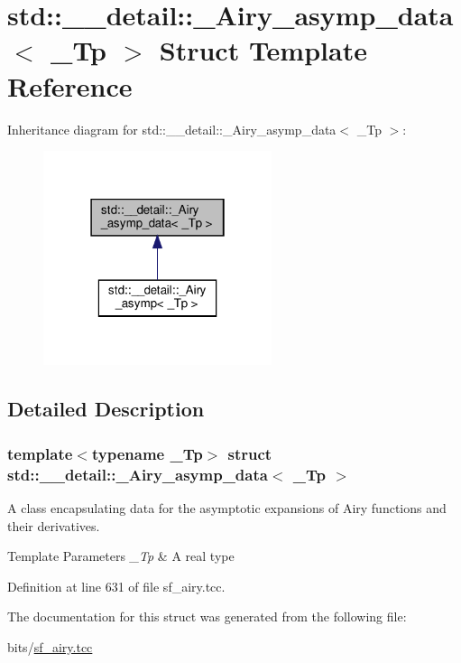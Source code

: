 \hypertarget{structstd_1_1____detail_1_1__Airy__asymp__data}{}\section{std\+:\+:\+\_\+\+\_\+detail\+:\+:\+\_\+\+Airy\+\_\+asymp\+\_\+data$<$ \+\_\+\+Tp $>$ Struct Template Reference}
\label{structstd_1_1____detail_1_1__Airy__asymp__data}


Inheritance diagram for std\+:\+:\+\_\+\+\_\+detail\+:\+:\+\_\+\+Airy\+\_\+asymp\+\_\+data$<$ \+\_\+\+Tp $>$\+:
\nopagebreak
\begin{figure}[H]
\begin{center}
\leavevmode
\includegraphics[width=190pt]{structstd_1_1____detail_1_1__Airy__asymp__data__inherit__graph}
\end{center}
\end{figure}


\subsection{Detailed Description}
\subsubsection*{template$<$typename \+\_\+\+Tp$>$\newline
struct std\+::\+\_\+\+\_\+detail\+::\+\_\+\+Airy\+\_\+asymp\+\_\+data$<$ \+\_\+\+Tp $>$}

A class encapsulating data for the asymptotic expansions of Airy functions and their derivatives.


\begin{DoxyTemplParams}{Template Parameters}
{\em \+\_\+\+Tp} & A real type \\
\hline
\end{DoxyTemplParams}


Definition at line 631 of file sf\+\_\+airy.\+tcc.



The documentation for this struct was generated from the following file\+:\begin{DoxyCompactItemize}
\item 
bits/\hyperlink{sf__airy_8tcc}{sf\+\_\+airy.\+tcc}\end{DoxyCompactItemize}
